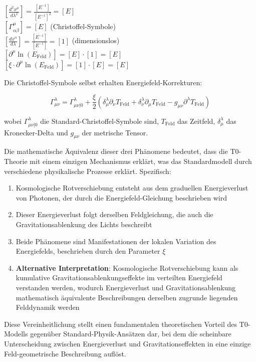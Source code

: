 \documentclass[12pt,a4paper]{article}
\newcommand{\tfield}{T_{\text{Feld}}}
\newcommand{\efield}{E_{\text{Feld}}}
\theoremstyle{definition}
\begin{document}
	\begin{dimanalysis}
		$\left[\frac{d^2 x^\mu}{d\lambda^2}\right] = \frac{[E^{-1}]}{[E^{-1}]^2} = [E]$\\
		$[\Gamma^\mu_{\alpha\beta}] = [E]$ (Christoffel-Symbole)\\
		$\left[\frac{dx^\alpha}{d\lambda}\right] = \frac{[E^{-1}]}{[E^{-1}]} = [1]$ (dimensionslos)\\
		$[\partial^\mu \ln(\efield)] = [E] \cdot [1] = [E]$\\
		$[\xi \cdot \partial^\mu \ln(\efield)] = [1] \cdot [E] = [E]$ \checkmark
	\end{dimanalysis}
	
	Die Christoffel-Symbole selbst erhalten Energiefeld-Korrekturen:
	
	\begin{equation}
		\Gamma^\lambda_{\mu\nu} = \Gamma^\lambda_{\mu\nu|0} + \frac{\xi}{2} \left(\delta^\lambda_\mu \partial_\nu \tfield + \delta^\lambda_\nu \partial_\mu \tfield - g_{\mu\nu} \partial^\lambda \tfield\right)
	\end{equation}
	
	wobei $\Gamma^\lambda_{\mu\nu|0}$ die Standard-Christoffel-Symbole sind, $\tfield$ das Zeitfeld, $\delta^\lambda_\mu$ das Kronecker-Delta und $g_{\mu\nu}$ der metrische Tensor.
	
	\begin{important}
		Die mathematische \"Aquivalenz dieser drei Ph\"anomene bedeutet, dass die T0-Theorie mit einem einzigen Mechanismus erkl\"art, was das Standardmodell durch verschiedene physikalische Prozesse erkl\"art. Spezifisch:
		
		\begin{enumerate}
			\item Kosmologische Rotverschiebung entsteht aus dem graduellen Energieverlust von Photonen, der durch die Energiefeld-Gleichung beschrieben wird
			\item Dieser Energieverlust folgt derselben Feldgleichung, die auch die Gravitationsablenkung des Lichts beschreibt
			\item Beide Ph\"anomene sind Manifestationen der lokalen Variation des Energiefelds, beschrieben durch den Parameter $\xi$
			\item \textbf{Alternative Interpretation}: Kosmologische Rotverschiebung kann als kumulative Gravitationsablenkungseffekte im verteilten Energiefeld verstanden werden, wodurch Energieverlust und Gravitationsablenkung mathematisch \"aquivalente Beschreibungen derselben zugrunde liegenden Felddynamik werden
		\end{enumerate}
		
		Diese Vereinheitlichung stellt einen fundamentalen theoretischen Vorteil des T0-Modells gegen\"uber Standard-Physik-Ans\"atzen dar, bei dem die scheinbare Unterscheidung zwischen Energieverlust und Gravitationseffekten in eine einzige Feld-geometrische Beschreibung aufl\"ost.
	\end{important}
	
\end{document}
